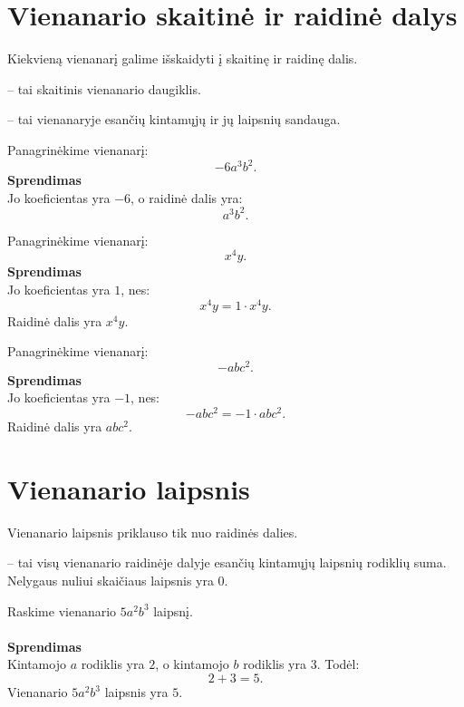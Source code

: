 \documentclass[11pt,a4paper]{scrartcl}
\begin{document}
\section{Vienanario skaitinė ir raidinė dalys}

Kiekvieną vienanarį galime išskaidyti į skaitinę ir raidinę dalis.

\begin{definition}
 -- tai skaitinis vienanario daugiklis.
\end{definition}

\begin{definition}
 -- tai vienanaryje esančių kintamųjų ir jų laipsnių sandauga.
\end{definition}

\begin{example}
Panagrinėkime vienanarį:
\[
-6a^3b^2.
\]
\textbf{Sprendimas}\\
Jo koeficientas yra $-6$, o raidinė dalis yra:
\[
a^3b^2.
\]
\end{example}

\begin{example}
Panagrinėkime vienanarį:
\[
x^4y.
\]
\textbf{Sprendimas}\\
Jo koeficientas yra $1$, nes:
\[
x^4y=1 \cdot x^4y.
\]
Raidinė dalis yra $x^4y$.
\end{example}

\begin{example}
Panagrinėkime vienanarį:
\[
-abc^2.
\]
\textbf{Sprendimas}\\
Jo koeficientas yra $-1$, nes:
\[
-abc^2=-1 \cdot abc^2.
\]
Raidinė dalis yra $abc^2$.
\end{example}

\section{Vienanario laipsnis}

Vienanario laipsnis priklauso tik nuo raidinės dalies.

\begin{definition}
 -- tai visų vienanario raidinėje dalyje esančių kintamųjų laipsnių rodiklių suma.
Nelygaus nuliui skaičiaus laipsnis yra $0$.
\end{definition}

\begin{example}
Raskime vienanario $5a^2b^3$ laipsnį.\\ \\
\textbf{Sprendimas}\\
Kintamojo $a$ rodiklis yra $2$, o kintamojo $b$ rodiklis yra $3$. Todėl:
\[
2+3=5.
\]
Vienanario $5a^2b^3$ laipsnis yra $5$.
\end{example}
\end{document}
